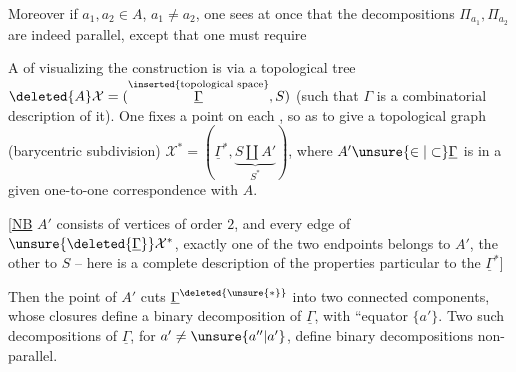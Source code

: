 
Moreover if $a_1,a_2\in A$, $a_1\ne a_2$, one sees at once that the decompositions $\Pi_{a_1},\Pi_{a_2}$ are indeed parallel, except that one must require %

A  of visualizing the construction is via a topological tree $\deleted{A}\mathcal{X}=(\overset{\text{\inserted{topological space}}}{\underline{\Gamma}},S)$ (such that $\Gamma$ is a combinatorial description of it). One fixes a point on each , so as to give a topological graph (barycentric subdivision) $\mathcal{X}^{\ast}=(\underline{\Gamma}^{\ast},\underbrace{S\amalg A'}_{S^{\ast}})$, where $A'\unsure{\in|\subset}\underline{\Gamma}$ is in a given one-to-one correspondence with  $A$.

 [\uline{NB} $A'$ consists of  vertices of order $2$, and  every edge of $\unsure{\deleted{\underline{\Gamma}}}\mathcal{X}^{\ast}$, exactly one of the two endpoints belongs to $A'$, the other to $S$ -- here is a complete description of the properties particular to the $\underline{\Gamma}^{\ast}$]

Then the point  of $A'$ cuts $\underline{\Gamma}^{\deleted{\unsure{\ast}}}$ into two connected components, whose closures define a binary decomposition of $\underline{\Gamma}$, with ``equator $\{a'\}$. Two such decompositions  of $\underline{\Gamma}$, for $a'\ne\unsure{a''|a'}$, define binary decompositions  non-parallel.
